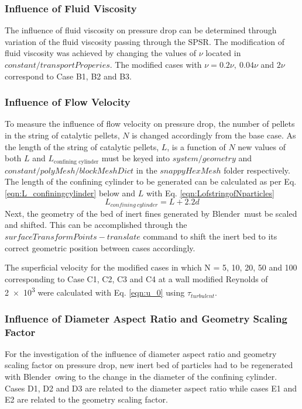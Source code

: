 \subsubsection{Influence of Fluid Viscosity}
The influence of fluid viscosity on pressure drop can be determined through variation of the fluid viscosity passing through the SPSR. The modification of fluid viscosity was achieved by changing the values of $\nu$ located in $constant/transportProperies$. The modified cases with $\nu = 0.2\nu,\: 0.04\nu$ and $2\nu$ correspond to Case B1, B2 and B3.

\subsubsection{Influence of Flow Velocity}
To measure the influence of flow velocity on pressure drop, the number of pellets in the string of catalytic pellets, $N$ is changed accordingly from the base case. As the length of the string of catalytic pellets, $L$, is a function of $N$ new values of both $L$ and $L_\text{confining cylinder}$ must be keyed into $system/geometry$ and $constant/polyMesh/blockMeshDict$ in the $snappyHexMesh$ folder respectively. The length of the confining cylinder to be generated can be calculated as per Eq. \ref{eqn:L_confiningcylinder} below and $L$ with Eq. \ref{eqn:LofstringofNparticles}
\begin{equation}\label{eqn:L_confiningcylinder}
L_{confining\:cylinder} = L + 2.2d
\end{equation}
Next, the geometry of the bed of inert fines generated by Blender\texttrademark\ must be scaled and shifted. This can be accomplished through the $surfaceTransformPoints -translate$ command to shift the inert bed to its correct geometric position between cases accordingly.

The superficial velocity for the modified cases in which N = 5, 10, 20, 50 and 100 corresponding to Case C1, C2, C3 and C4 at a wall modified Reynolds of \num{2e3} were calculated with Eq. \ref{eqn:u_0} using $\tau_{turbulent}$.

\subsubsection{Influence of Diameter Aspect Ratio and Geometry Scaling Factor}
For the investigation of the influence of diameter aspect ratio and geometry scaling factor on pressure drop, new inert bed of particles had to be regenerated with Blender\texttrademark\ owing to the change in the diameter of the confining cylinder. Cases D1, D2 and D3 are related to the diameter aspect ratio while cases E1 and E2 are related to the geometry scaling factor.


